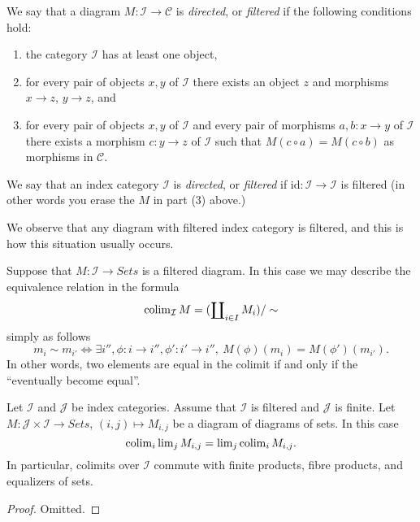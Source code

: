 \begin{definition}
\label{definition-directed}
We say that a diagram $M : \mathcal{I} \to \mathcal{C}$ is {\it directed},
or {\it filtered} if the following conditions hold:
\begin{enumerate}
\item the category $\mathcal{I}$ has at least one object,
\item for every pair of objects $x, y$ of $\mathcal{I}$
there exists an object $z$ and morphisms $x \to z$,
$y \to z$, and
\item for every pair of objects $x, y$ of $\mathcal{I}$
and every pair of morphisms $a, b : x \to y$ of $\mathcal{I}$
there exists a morphism $c : y \to z$ of $\mathcal{I}$
such that $M(c \circ a) = M(c \circ b)$ as morphisms in $\mathcal{C}$.
\end{enumerate}
We say that an index category $\mathcal{I}$ is {\it directed}, or
{\it filtered} if $\text{id} : \mathcal{I} \to \mathcal{I}$ is filtered
(in other words you erase the $M$ in part (3) above.)
\end{definition}

\noindent
We observe that any diagram with filtered index category is filtered,
and this is how this situation usually occurs.

\medskip\noindent
Suppose that $M : \mathcal{I} \to \textit{Sets}$ is a filtered diagram. In
this case we may describe the equivalence relation in the formula
$$
\mathop{\rm colim}\nolimits_{\mathcal{I}} M
=
(\coprod\nolimits_{i\in I} M_i)/\sim
$$
simply as follows
$$
m_i \sim m_{i'}
\Leftrightarrow
\exists i'', \phi : i \to i'', \phi': i' \to i'', \ 
M(\phi)(m_i) = M(\phi')(m_{i'}).
$$
In other words, two elements are equal in the colimit if and only if
the ``eventually become equal''.

\begin{lemma}
\label{lemma-directed-commutes}
Let $\mathcal{I}$ and $\mathcal{J}$ be index categories.
Assume that $\mathcal{I}$ is filtered and $\mathcal{J}$ is finite.
Let $M : \mathcal{J} \times \mathcal{I} \to \textit{Sets}$,
$(i, j) \mapsto M_{i, j}$ be a diagram of diagrams of sets.
In this case
$$
\mathop{\rm colim}\nolimits_i \mathop{\rm lim}\nolimits_j M_{i, j}
=
\mathop{\rm lim}\nolimits_j \mathop{\rm colim}\nolimits_i M_{i, j}.
$$
In particular, colimits over $\mathcal{I}$ commute with finite products,
fibre products, and equalizers of sets.
\end{lemma}

\begin{proof}
Omitted.
\end{proof}


